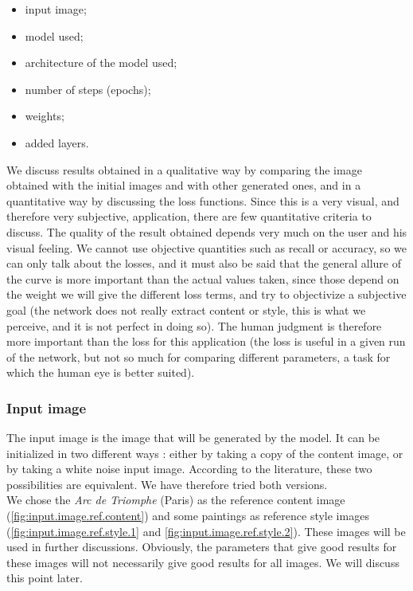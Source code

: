 \documentclass[twocolumn,superscriptaddress,aps,floatfix,nofootinbib]{revtex4-1}
\begin{document}
    \begin{itemize}
        \item input image;
        \item model used;
        \item architecture of the model used;
        \item number of steps (epochs);
        \item weights;
        \item added layers.
    \end{itemize}
    
    We discuss results obtained in a qualitative way by comparing the image obtained with the initial images and with other generated ones, and in a quantitative way by discussing the loss functions. Since this is a very visual, and therefore very subjective, application, there are few quantitative criteria to discuss. The quality of the result obtained depends very much on the user and his visual feeling. We cannot use objective quantities such as recall or accuracy, so we can only talk about the losses, and it must also be said that the general allure of the curve is more important than the actual values taken, since those depend on the weight we will give the different loss terms, and try to objectivize a subjective goal (the network does not really extract content or style, this is what we perceive, and it is not perfect in doing so). The human judgment is therefore more important than the loss for this application (the loss is useful in a given run of the network, but not so much for comparing different parameters, a task for which the human eye is better suited).
    
    \subsubsection{Input image}
    
    The input image is the image that will be generated by the model. It can be initialized in two different ways : either by taking a copy of the content image, or by taking a white noise input image. According to the literature, these two possibilities are equivalent. We have therefore tried both versions.\\
    
    We chose the \emph{Arc de Triomphe} (Paris) as the reference content image (\ref{fig:input.image.ref.content}) and some paintings as reference style images (\ref{fig:input.image.ref.style.1} and \ref{fig:input.image.ref.style.2}). These images will be used in further discussions. Obviously, the parameters that give good results for these images will not necessarily give good results for all images. We will discuss this point later.
    
\end{document}
